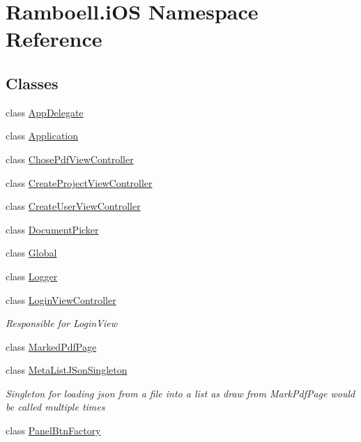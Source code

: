 \hypertarget{namespace_ramboell_1_1i_o_s}{}\section{Ramboell.\+i\+OS Namespace Reference}
\label{namespace_ramboell_1_1i_o_s}
\subsection*{Classes}
\begin{DoxyCompactItemize}
\item 
class \hyperlink{class_ramboell_1_1i_o_s_1_1_app_delegate}{App\+Delegate}
\item 
class \hyperlink{class_ramboell_1_1i_o_s_1_1_application}{Application}
\item 
class \hyperlink{class_ramboell_1_1i_o_s_1_1_chose_pdf_view_controller}{Chose\+Pdf\+View\+Controller}
\item 
class \hyperlink{class_ramboell_1_1i_o_s_1_1_create_project_view_controller}{Create\+Project\+View\+Controller}
\item 
class \hyperlink{class_ramboell_1_1i_o_s_1_1_create_user_view_controller}{Create\+User\+View\+Controller}
\item 
class \hyperlink{class_ramboell_1_1i_o_s_1_1_document_picker}{Document\+Picker}
\item 
class \hyperlink{class_ramboell_1_1i_o_s_1_1_global}{Global}
\item 
class \hyperlink{class_ramboell_1_1i_o_s_1_1_logger}{Logger}
\item 
class \hyperlink{class_ramboell_1_1i_o_s_1_1_login_view_controller}{Login\+View\+Controller}
\begin{DoxyCompactList}\small\item\em Responsible for Login\+View \end{DoxyCompactList}\item 
class \hyperlink{class_ramboell_1_1i_o_s_1_1_marked_pdf_page}{Marked\+Pdf\+Page}
\item 
class \hyperlink{class_ramboell_1_1i_o_s_1_1_meta_list_j_son_singleton}{Meta\+List\+J\+Son\+Singleton}
\begin{DoxyCompactList}\small\item\em Singleton for loading json from a file into a list as draw from Mark\+Pdf\+Page would be called multiple times \end{DoxyCompactList}\item 
class \hyperlink{class_ramboell_1_1i_o_s_1_1_panel_btn_factory}{Panel\+Btn\+Factory}

\end{DoxyCompactItemize}
